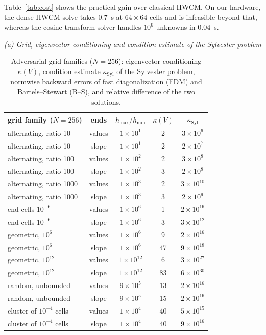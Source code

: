 \documentclass[smallextended,envcountsame]{svjour3}
\begin{document}
Table~\ref{tab:cost} shows the practical gain over classical HWCM. On our hardware, the dense HWCM solve takes
0.7~s at $64\times64$ cells and is infeasible beyond that, whereas the cosine-transform solver handles
$10^6$ unknowns in 0.04~s.

\begin{table}[t]\centering\footnotesize
\caption{Adversarial grid families ($N=256$): eigenvector conditioning $\kappa(V)$, condition estimate
$\kappa_{\mathrm{Syl}}$ of the Sylvester problem, normwise backward errors of fast diagonalization (FDM) and
Bartels--Stewart (B--S), and relative difference of the two solutions.}\label{tab:fdmstab}
\textit{(a) Grid, eigenvector conditioning and condition estimate of the Sylvester problem}\\[2pt]
\begin{tabular}{p{}c c c c}
\toprule
grid family ($N=256$) & ends & $h_{\max}/h_{\min}$ & $\kappa(V)$ & $\kappa_{\mathrm{Syl}}$\\
\midrule
alternating, ratio 10 & values & $1{\times}10^{1}$ & 2 & $3{\times}10^{6}$\\
alternating, ratio 10 & slope & $1{\times}10^{1}$ & 2 & $2{\times}10^{7}$\\
alternating, ratio 100 & values & $1{\times}10^{2}$ & 2 & $3{\times}10^{8}$\\
alternating, ratio 100 & slope & $1{\times}10^{2}$ & 3 & $2{\times}10^{8}$\\
alternating, ratio 1000 & values & $1{\times}10^{3}$ & 2 & $3{\times}10^{10}$\\
alternating, ratio 1000 & slope & $1{\times}10^{3}$ & 3 & $2{\times}10^{9}$\\
end cells $10^{-6}$ & values & $1{\times}10^{6}$ & 1 & $2{\times}10^{16}$\\
end cells $10^{-6}$ & slope & $1{\times}10^{6}$ & 3 & $3{\times}10^{12}$\\
geometric, $10^6$ & values & $1{\times}10^{6}$ & 9 & $2{\times}10^{16}$\\
geometric, $10^6$ & slope & $1{\times}10^{6}$ & 47 & $9{\times}10^{18}$\\
geometric, $10^{12}$ & values & $1{\times}10^{12}$ & 6 & $3{\times}10^{27}$\\
geometric, $10^{12}$ & slope & $1{\times}10^{12}$ & 83 & $6{\times}10^{30}$\\
random, unbounded & values & $9{\times}10^{5}$ & 13 & $2{\times}10^{16}$\\
random, unbounded & slope & $9{\times}10^{5}$ & 15 & $2{\times}10^{16}$\\
cluster of $10^{-4}$ cells & values & $1{\times}10^{4}$ & 40 & $5{\times}10^{15}$\\
cluster of $10^{-4}$ cells & slope & $1{\times}10^{4}$ & 40 & $9{\times}10^{16}$\\
\bottomrule
\end{tabular}


\end{table}
\end{document}
